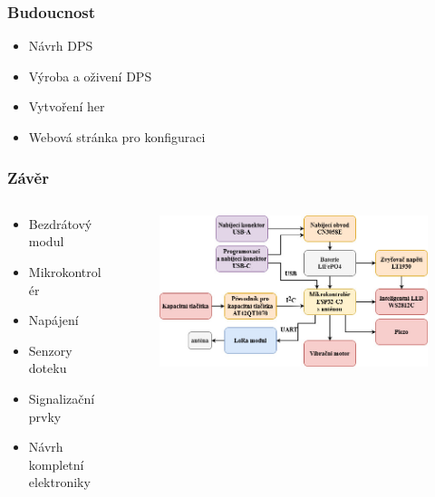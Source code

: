\documentclass[%
  12pt,       				%
	t,                  %
	aspectratio=1610,   %
	unicode,						%
]{beamer}				    	%
\begin{document}
\begin{frame} 
	\frametitle{Budoucnost}
	\begin{itemize}
		\item Návrh DPS
		\item Výroba a oživení DPS
		\item Vytvoření her 
		\item Webová stránka pro konfiguraci
	\end{itemize}
\end{frame}


\begin{frame} 
	\frametitle{Závěr}

	\begin{center}
		\begin{columns}[T] 								%
			\begin{column}{0.3\textwidth}		%
				\begin{itemize}
					\item Bezdrátový modul
					\item Mikrokontrolér
					\item Napájení 
					\item Senzory doteku
					\item Signalizační prvky 
					\item Návrh kompletní elektroniky
				\end{itemize}
			\end{column}
			\begin{column}{0.7\textwidth}		%
				\begin{figure}
					\centering
					\vspace{0.5cm}
					\includegraphics[width=0.9\columnwidth]{obrazky/vysledne_blokove_schema_prezentace.jpg}
				\end{figure}
			\end{column}
		\end{columns}	
	\end{center}
	
\end{frame}
\end{document}
